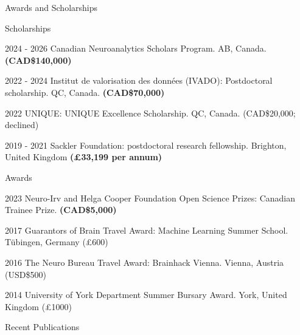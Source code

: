 \documentclass{resume} %
\begin{document}
\begin{rSection}{Awards and Scholarships}
  
  \begin{rSubsection}{Scholarships}{}{}{}
    \item 2024 - 2026 Canadian Neuroanalytics Scholars Program. AB, Canada. \textbf{(CAD\$140,000)}
    \item 2022 - 2024 Institut de valorisation des données (IVADO): Postdoctoral scholarship. QC, Canada. \textbf{(CAD\$70,000)}
    \item 2022 UNIQUE: UNIQUE Excellence Scholarship. QC, Canada. (CAD\$20,000; declined)
    \item 2019 - 2021 Sackler Foundation: postdoctoral research fellowship. Brighton, United Kingdom \textbf{(\pounds 33,199 per annum)}
  \end{rSubsection}
  
  \begin{rSubsection}{Awards}{}{}{}
  	\item 2023 Neuro-Irv and Helga Cooper Foundation Open Science Prizes: Canadian Trainee Prize. \textbf{(CAD\$5,000)}
    \item 2017 Guarantors of Brain Travel Award: Machine Learning Summer School. T\"{u}bingen, Germany (\pounds 600)
    \item 2016 The Neuro Bureau Travel Award: Brainhack Vienna. Vienna, Austria (USD\$500)
    \item 2014 University of York Department Summer Bursary Award. York, United Kingdom (\pounds 1000)
  \end{rSubsection}

\end{rSection}
\pagebreak

\begin{rSection}{Recent Publications}

  

  


\end{rSection}
\pagebreak
\end{document}
